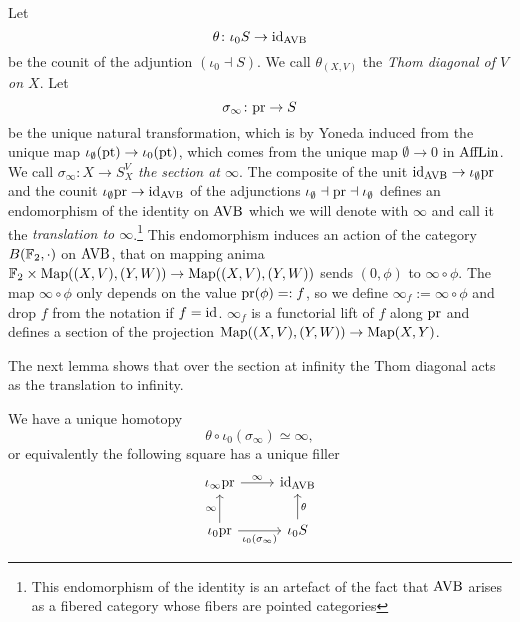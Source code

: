 \begin{construction}
    Let 
    \[
      \theta \colon \iota_0 S \to \mathrm{id}_{\operatorname{AVB}}  
    \]
    be the counit of the adjuntion $(\iota_0 \dashv S)$.
    We call $\theta_{(X,V)}$ the \emph{Thom diagonal of $V$ on $X$}.
    Let 
    \[ 
        \sigma_\infty \colon \mathrm{pr} \to S    
    \]
    be the unique natural transformation, which is by Yoneda induced from the unique map $\iota_\emptyset(\mathrm{pt}) \to \iota_0(\mathrm{pt})$, 
    which comes from the unique map $\emptyset \to 0$ in $\operatorname{AffLin}$.
    We call $\sigma_\infty \colon X \to S^V_X$ \emph{the section at $\infty$}.
    The composite of the unit $\mathrm{id}_{\operatorname{AVB}} \to \iota_\emptyset \mathrm{pr}$ and the counit $\iota_\emptyset \mathrm{pr} \to \mathrm{id}_{\operatorname{AVB}}$
    of the adjunctions $\iota_\emptyset \dashv \mathrm{pr} \dashv \iota_\emptyset$ defines an endomorphism
    of the identity on $\operatorname{AVB}$ which we will denote with $\infty$
    and call it the \emph{translation to $\infty$}.\footnote{This endomorphism of the identity is an artefact of the fact that $\operatorname{AVB}$ arises as a fibered category whose fibers are pointed categories}
    This endomorphism induces an action of the category $B(\mathbb{F}_2,\cdot)$ on $\operatorname{AVB}$, that on mapping anima 
    $\mathbb{F}_2 \times \operatorname{Map}((X,V),(Y,W)) \to \operatorname{Map}((X,V),(Y,W))$ sends $(0, \phi)$ to $\infty \circ \phi$.
    The map $\infty \circ \phi$ only depends on the value $\mathrm{pr}(\phi) =: f$, so we define 
    $\infty_{f} := \infty \circ \phi$ and drop $f$ from the notation if $f = \mathrm{id}$. $\infty_f$ is a functorial lift of $f$ along $\mathrm{pr}$ and defines a section 
    of the projection $\operatorname{Map}((X,V),(Y,W)) \to \operatorname{Map}(X,Y)$.
    \label{constr:thomdiag1}
\end{construction}

    The next lemma shows that over the section at infinity the Thom diagonal acts as the translation to infinity.
\begin{proposition}
    We have a unique homotopy
    \[
      \theta \circ \iota_0(\sigma_\infty) \simeq \infty , 
    \]
    or equivalently the following square has a unique filler 
    \[\begin{tikzcd}
        {\iota_\infty \pr} & {\id_{\AVB}} \\
        {\iota_0 \pr} & {\iota_0S}
        \arrow["{\iota_0(\sigma_\infty)}"', from=2-1, to=2-2]
        \arrow["\theta"', from=2-2, to=1-2]
        \arrow["\infty", from=2-1, to=1-1]
        \arrow["\infty", from=1-1, to=1-2]
    \end{tikzcd}\label{diag:AVBsquare}\]\label{prop: thomatinfty}
\end{proposition}

